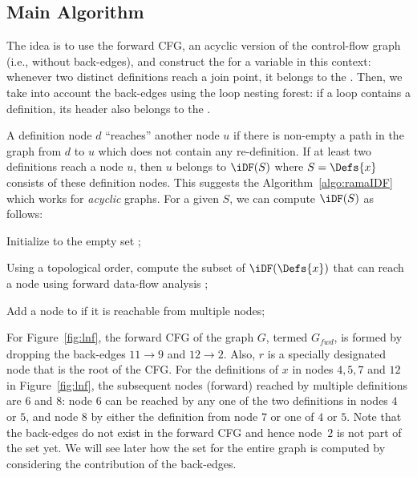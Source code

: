 {\subsection{Main Algorithm}
The idea is to use the forward CFG, an acyclic version of the control-flow graph (i.e., without back-edges), and construct the \iDF for a variable in this context: 
whenever two distinct definitions reach a join point, it belongs to the \iDF. 
Then, we take into account the back-edges using the loop nesting forest: 
if a loop contains a definition, its header also belongs to the \iDF.

\medskip
    
A definition node $d$ ``reaches'' another node $u$ if there is non-empty a path in the graph from $d$ to $u$ which does not contain any re-definition. 
If at least two definitions reach a node $u$, then $u$ belongs to $\iDF(S)$ where $S=\Defs{x}$ consists of these definition nodes. 
This suggests the Algorithm~\ref{algo:ramaIDF} which works for \emph{acyclic} graphs. 
For a given $S$, we can compute $\iDF(S)$ as follows:

\begin{itemize}
\item { Initialize \iDF to the empty set };
\item { Using a topological order, compute the subset of $\iDF(\Defs{x})$ that can reach a node using forward data-flow analysis };
{\item} {Add a node to \iDF if it is reachable from multiple nodes};
\end{itemize}  

For Figure~\ref{fig:lnf}, the forward CFG of the graph $G$, termed $G_{\textit{fwd}}$, is formed by dropping the back-edges $11 \rightarrow 9$ and $12 \rightarrow 2$. 
Also, $r$ is a specially designated node that is the root of the CFG. 
For the definitions of $x$ in nodes $4,5,7$ and $12$ in Figure~\ref{fig:lnf}, the subsequent nodes (forward) reached by multiple definitions are $6$ and $8$: 
node $6$ can be reached by any one of the two definitions in nodes $4$ or $5$, and node $8$ by either the definition from node $7$ or one of $4$ or $5$. 
Note that the back-edges do not exist in the forward CFG and hence node~$2$ is not part of the \iDF set yet. 
We will see later how the \iDF set for the entire graph is computed by considering the contribution of the back-edges.



}
